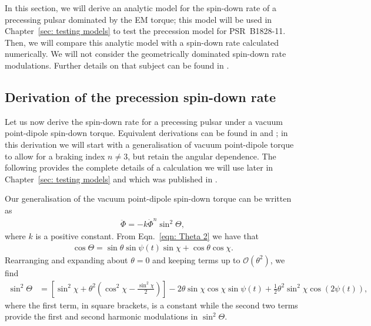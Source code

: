 \documentclass[../full_thesis/full_thesis.tex]{subfiles}
\begin{document}
In this section, we will derive an analytic model for the spin-down rate of a
precessing pulsar dominated by the EM torque; this model will be used in
Chapter~\ref{sec: testing models} to test the precession model for
PSR~B1828-11. Then, we will compare this analytic model with a spin-down rate
calculated numerically. We will not consider the geometrically dominated
spin-down rate modulations. Further details on that subject can be found in
\citet{Jones2001}.

\subsection{Derivation of the precession spin-down rate}
\label{sec: derivation of the spin-down rate}
Let us now derive the spin-down rate for a precessing pulsar under a vacuum
point-dipole spin-down torque. Equivalent derivations can be found in
\citet{Link2001} and \citet{Jones2001}; in this derivation we will start
with a generalisation of vacuum point-dipole torque to allow for a braking
index $n\ne3$, but retain the angular dependence. The following provides
the complete details of a calculation we will use later in Chapter~\ref{sec:
testing models} and which was published in \citet{Ashton2016}.

Our generalisation of the vacuum point-dipole spin-down torque can be written as
\begin{align}
\ddot{\Phi} = -k \dot{\Phi}^{n} \sin^{2}\Theta,
\label{eqn: EM DE}
\end{align}
where $k$ is a positive constant. From Eqn.~\eqref{eqn: Theta 2} we have that
\begin{align}
\cos\Theta = \sin\theta \sin \psi(t) \sin \chi + \cos\theta \cos\chi.
\end{align}
Rearranging and expanding about $\theta = 0$ and keeping terms up to
$\mathcal{O}(\theta^{2})$, we find
\begin{align}
\sin^{2}\Theta & =
\left[
\sin^{2}\chi + \theta^{2}\left(\cos^{2}\chi - \frac{\sin^{2}\chi}{2}\right)
\right]
- 2\theta \sin\chi\cos\chi \sin\psi(t)
 + \frac{1}{2}\theta^{2}\sin^{2}\chi\cos(2\psi(t)),
\label{eqn: sin 2 Theta}
\end{align}
where the first term, in square brackets, is a constant while the second two
terms provide the first and second harmonic modulations in $\sin^{2}\Theta$.
\end{document}
